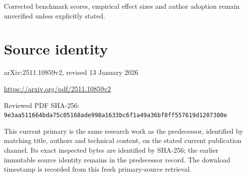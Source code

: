 \documentclass[11pt]{article}
\begin{document}
Corrected benchmark scores, empirical effect sizes and author adoption remain unverified unless explicitly stated.\par

\section*{Source identity}

arXiv:2511.10859v2, revised 13 January 2026

\url{https://arxiv.org/pdf/2511.10859v2}

Reviewed PDF SHA-256: \nolinkurl{9e3aa511664bda75c05168ade998a1633bc6f1a49a36bf8ff557619d1207380e}

This current primary is the same research work as the predecessor, identified by matching title, authors and technical content, on the stated current publication channel. Its exact inspected bytes are identified by SHA-256; the earlier immutable source identity remains in the predecessor record. The download timestamp is recorded from this fresh primary-source retrieval.
\end{document}
